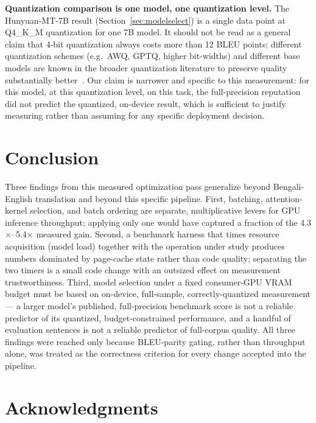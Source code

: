 \documentclass[conference]{IEEEtran}
\newcommand{\NLLBSPEEDUP}{5.4$\times$}
\newcommand{\SEAMLESSSPEEDUP}{4.3$\times$}
\begin{document}
\textbf{Quantization comparison is one model, one quantization level.}
The Hunyuan-MT-7B result (Section~\ref{sec:modelselect}) is a single
data point at Q4\_K\_M quantization for one 7B model. It should not be
read as a general claim that 4-bit quantization always costs more than
12 BLEU points; different quantization schemes (e.g.\ AWQ, GPTQ, higher
bit-widths) and different base models are known in the broader
quantization literature to preserve quality substantially
better~\cite{dettmers2023qlora}. Our claim is narrower and specific to
this measurement: for this model, at this quantization level, on this
task, the full-precision reputation did not predict the quantized,
on-device result, which is sufficient to justify measuring rather than
assuming for any specific deployment decision.

\section{Conclusion}

Three findings from this measured optimization pass generalize beyond
Bengali-English translation and beyond this specific pipeline. First,
batching, attention-kernel selection, and batch ordering are separate,
multiplicative levers for GPU inference throughput; applying only one
would have captured a fraction of the \SEAMLESSSPEEDUP--\NLLBSPEEDUP{}
measured gain. Second, a benchmark harness that times resource
acquisition (model load) together with the operation under study
produces numbers dominated by page-cache state rather than code quality;
separating the two timers is a small code change with an outsized effect
on measurement trustworthiness. Third, model selection under a fixed
consumer-GPU VRAM budget must be based on on-device, full-sample,
correctly-quantized measurement --- a larger model's published,
full-precision benchmark score is not a reliable predictor of its
quantized, budget-constrained performance, and a handful of evaluation
sentences is not a reliable predictor of full-corpus quality. All three
findings were reached only because BLEU-parity gating, rather than
throughput alone, was treated as the correctness criterion for every
change accepted into the pipeline.

\section*{Acknowledgments}
\end{document}
